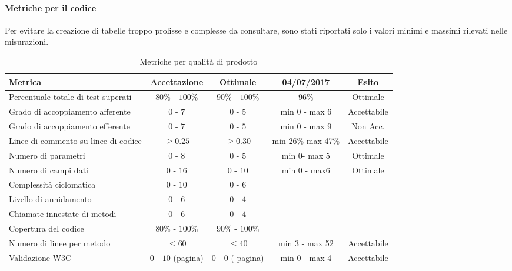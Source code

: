 \documentclass[../PianoDiQualifica.tex]{subfiles}
\begin{document}
					\paragraph{Metriche per il codice\\}
						Per evitare la creazione di tabelle troppo prolisse e complesse da consultare,
						sono stati riportati solo i valori minimi e massimi rilevati nelle misurazioni.
							\begin{table}[H]
							\center
							\begin{tabular}{|>{\centering}p{5cm}|c|c|c|c|}
								\hline
								\rowcolor{blue!30}\textbf{Metrica} & \textbf{Accettazione} & \textbf{Ottimale}&\textbf{04/07/2017}&\textbf{Esito} \\ \hline
								Percentuale totale di test superati &$80\%$ - $100\%$&$90\%$ - $100\%$&96\%&Ottimale\\ \hline
								Grado di accoppiamento afferente&$0$ - $7$&$0$ - $5$&
								min 0 - max 6 &Accettabile\\ \hline
								Grado di accoppiamento efferente &$0$ - $7$&$0$ - $5$&min 0 - max 9 & Non Acc. \\ \hline
								Linee di commento su linee di codice &$\geq 0.25$& $\geq 0.30$ &min 26\%-max 47\% &Accettabile\\ \hline
								Numero di parametri &$0$ - $8$&$0$ - $5$&min 0- max 5 & Ottimale\\ \hline
								Numero di campi dati &$0$ - $16$&$0$ - $10$&min 0 - max6&Ottimale\\ \hline
								Complessità ciclomatica &$0$ - $10$&$0$ - $6$ &&\\ \hline
								Livello di annidamento &$0$ - $6$&$0$ - $4$&&\\ \hline
								Chiamate innestate di metodi &$0$ - $6$&$0$ - $4$ &&\\ \hline
								Copertura del codice & $80\%$ - $100\%$&$90\%$ - $100\%$ &&\\ \hline
								Numero di linee per metodo & $\leq 60$ & $\leq 40$ &min 3 - max 52 &Accettabile\\ \hline
								Validazione W3C & $0$ - $10$ (pagina) & $0$ - $0$ ( pagina)& min 0 - max 4&Accettabile \\ \hline
							\end{tabular}
							\caption{Metriche per qualità di prodotto}
						\end{table}
\end{document}
